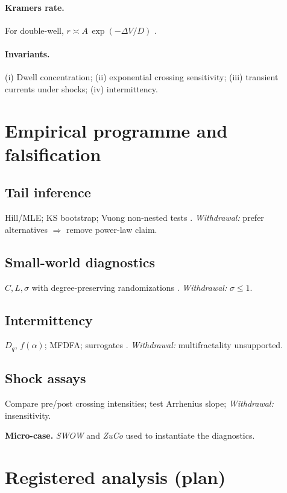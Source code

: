 \documentclass[sn-basic]{sn-jnl}
\begin{document}
\paragraph{Kramers rate.} For double-well, $r \asymp A\,\exp(-\Delta V/D)$ \citep{Gardiner2009,Risken1996,Kramers1940}.

\paragraph{Invariants.} (i) Dwell concentration; (ii) exponential crossing sensitivity; (iii) transient currents under shocks; (iv) intermittency.

\section{Empirical programme and falsification}\label{sec:empirics}
\subsection{Tail inference}
Hill/MLE; KS bootstrap; Vuong non-nested tests \citep{ClausetShaliziNewman2009,Newman2005,Mitzenmacher2004,StumpfPorter2012}.
\emph{Withdrawal:} prefer alternatives $\Rightarrow$ remove power-law claim.

\subsection{Small-world diagnostics}
$C,L,\sigma$ with degree-preserving randomizations \citep{WattsStrogatz1998}. \emph{Withdrawal:} $\sigma\le1$.

\subsection{Intermittency}
$D_q$, $f(\alpha)$; MFDFA; surrogates \citep{KantzSchreiber2004}. \emph{Withdrawal:} multifractality unsupported.

\subsection{Shock assays}
Compare pre/post crossing intensities; test Arrhenius slope; \emph{Withdrawal:} insensitivity.

\noindent\textbf{Micro-case.}
\emph{SWOW} \citep{DeDeyne2019} and \emph{ZuCo} \citep{Hollenstein2018} used to instantiate the diagnostics.

\section{Registered analysis (plan)}\label{sec:regplan}
\end{document}
